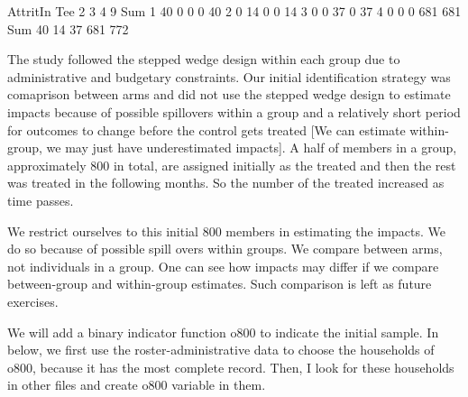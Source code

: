 \begin{Schunk}
\begin{Soutput}
     AttritIn
Tee     2   3   4   9 Sum
  1    40   0   0   0  40
  2     0  14   0   0  14
  3     0   0  37   0  37
  4     0   0   0 681 681
  Sum  40  14  37 681 772
\end{Soutput}
\end{Schunk}








The study followed the stepped wedge design within each group due to administrative and budgetary constraints. Our initial identification strategy was comaprison between arms and did not use the stepped wedge design to estimate impacts because of possible spillovers within a group and a relatively short period for outcomes to change before the control gets treated [We can estimate within-group, we may just have underestimated impacts]. A half of members in a group, approximately 800 in total, are assigned initially as the treated and then the rest was treated in the following months. So the number of the treated increased as time passes. 

We restrict ourselves to this initial 800 members in estimating the impacts. We do so because of possible spill overs within groups. We compare between arms, not individuals in a group. One can see how impacts may differ if we compare between-group and within-group estimates. Such comparison is left as future exercises.




We will add a binary indicator function \textsf{o800} to indicate the initial sample. In below, we first use the roster-administrative data to choose the households of \textsf{o800}, because it has the most complete record. Then, I look for these households in other files and create \textsf{o800} variable in them.

